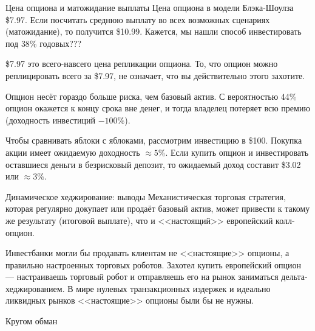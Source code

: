 \documentclass{beamer}
\begin{document}
\begin{frame}{Цена опциона и матожидание выплаты}
\justify
Цена опциона в модели Блэка-Шоулза \alert{\$7.97}. Если посчитать среднюю выплату во всех возможных сценариях (матожидание), то получится \alert{\$10.99}. Кажется, мы нашли способ инвестировать под \alert{38\%} годовых???

\justify
\$7.97 это всего-навсего цена репликации опциона. То, что опцион можно реплицировать всего за \$7.97, не означает, что вы действительно этого захотите.

\justify
Опцион несёт гораздо больше риска, чем базовый актив. С вероятностью 44\% опцион окажется к концу срока вне денег, и тогда владелец потеряет всю премию (доходность инвестиций $-100\%$).

\justify
Чтобы сравнивать яблоки с яблоками, рассмотрим инвестицию в \$100. Покупка акции имеет ожидаемую доходность $\approx 5\%$. Если купить опцион и инвестировать оставшиеся деньги в безрисковый депозит, то ожидаемый доход составит \$3.02 или $\approx 3\%$.
\end{frame}



\begin{frame}{Динамическое хеджирование: выводы}
\justify
Механистическая торговая стратегия, которая регулярно докупает или продаёт базовый актив, может привести к такому же
результату (итоговой выплате), что и <<настоящий>> европейский колл-опцион.

\justify
Инвестбанки могли бы продавать клиентам не <<настоящие>> опционы, а правильно настроенных торговых роботов. Захотел
купить европейский опцион --- настраиваешь торговый робот и отправляешь его на рынок заниматься дельта-хеджированием.
В мире нулевых транзакционных издержек и идеально ликвидных рынков <<настоящие>> опционы были бы не нужны.
\end{frame}



\begin{frame}{Кругом обман}
\centering
{}
\end{frame}
\end{document}
